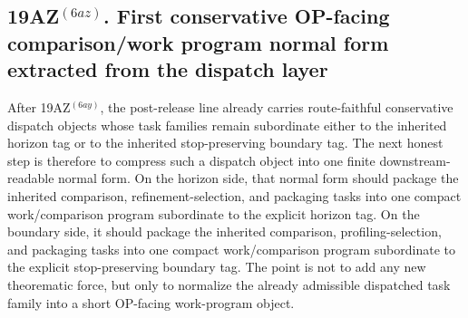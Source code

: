 \subsection*{19AZ$^{(6az)}$. First conservative OP-facing comparison/work program normal form extracted from the dispatch layer}
\label{sec:first-conservative-op-facing-comparison-work-program-normal-form-extracted-from-the-dispatch-layer}
After 19AZ$^{(6ay)}$, the post-release line already carries route-faithful conservative dispatch objects whose task families remain subordinate either to the inherited horizon tag or to the inherited stop-preserving boundary tag. The next honest step is therefore to compress such a dispatch object into one finite downstream-readable normal form. On the horizon side, that normal form should package the inherited comparison, refinement-selection, and packaging tasks into one compact work/comparison program subordinate to the explicit horizon tag. On the boundary side, it should package the inherited comparison, profiling-selection, and packaging tasks into one compact work/comparison program subordinate to the explicit stop-preserving boundary tag. The point is not to add any new theorematic force, but only to normalize the already admissible dispatched task family into a short OP-facing work-program object.


